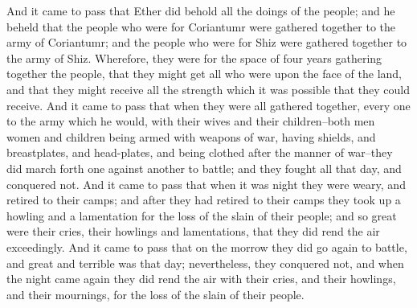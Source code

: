 And it came to pass that Ether did behold all the doings of the people; and he beheld that the people who were for Coriantumr were gathered together to the army of Coriantumr; and the people who were for Shiz were gathered together to the army of Shiz.
\bverse \iffalse Wherefore, they were for the space of four years gathering together the people, that they might get all who were upon the face of the land, and that they might receive all the strength which it was possible that they could receive. \fi
Wherefore, they were for the space of four years gathering together the people, that they might get all who were upon the face of the land, and that they might receive all the strength which it was possible that they could receive.
\bverse \iffalse And it came to pass that when they were all gathered together, every one to the army which he would, with their wives and their children--both men women and children being armed with weapons of war, having shields, and breastplates, and head-plates, and being clothed after the manner of war--they did march forth one against another to battle; and they fought all that day, and conquered not. \fi
And it came to pass that when they were all gathered together, every one to the army which he would, with their wives and their children--both men women and children being armed with weapons of war, having shields, and breastplates, and head-plates, and being clothed after the manner of war--they did march forth one against another to battle; and they fought all that day, and conquered not.
\bverse \iffalse And it came to pass that when it was night they were weary, and retired to their camps; and after they had retired to their camps they took up a howling and a lamentation for the loss of the slain of their people; and so great were their cries, their howlings and lamentations, that they did rend the air exceedingly. \fi
And it came to pass that when it was night they were weary, and retired to their camps; and after they had retired to their camps they took up a howling and a lamentation for the loss of the slain of their people; and so great were their cries, their howlings and lamentations, that they did rend the air exceedingly.
\bverse \iffalse And it came to pass that on the morrow they did go again to battle, and great and terrible was that day; nevertheless, they conquered not, and when the night came again they did rend the air with their cries, and their howlings, and their mournings, for the loss of the slain of their people. \fi
And it came to pass that on the morrow they did go again to battle, and great and terrible was that day; nevertheless, they conquered not, and when the night came again they did rend the air with their cries, and their howlings, and their mournings, for the loss of the slain of their people.
